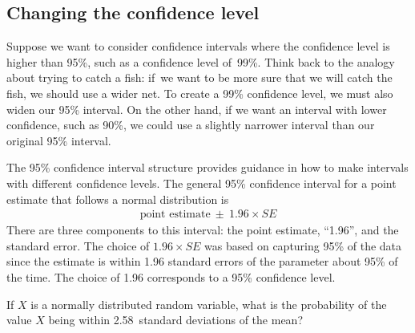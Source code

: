 \D{\newpage}

\subsection{Changing the confidence level}
\label{changingTheConfidenceLevelSection}


Suppose we want to consider confidence intervals where the confidence
level is higher than 95\%, such as a confidence
level of~99\%. Think back to the analogy about trying to catch a fish:
if~we want to be more sure that we will catch the fish, we should use
a wider net. To create a 99\% confidence level, we must also widen our
95\% interval. On the other hand, if we want an interval with lower
confidence, such as 90\%, we could use a slightly narrower
interval than our original 95\% interval.

The 95\% confidence interval structure provides guidance in
how to make intervals with different confidence levels.
The general 95\% confidence interval for a point estimate
that follows a normal distribution is
\begin{eqnarray*}
\text{point estimate}\ \pm\ 1.96 \times SE
\end{eqnarray*}
There are three components to this interval: the point estimate,
``1.96'', and the standard error. The choice of $1.96\times SE$ was
based on capturing 95\% of the data since the estimate is within
1.96 standard errors of the parameter about 95\% of the time.
The choice of 1.96 corresponds to a 95\% confidence level. 

\begin{exercisewrap}
\begin{nexercise} \label{leadInForMakingA99PercentCIExercise}
If $X$ is a normally distributed random variable, what is the
probability of the value $X$ being
within 2.58~standard deviations of the mean?\footnotemark
\end{nexercise}
\end{exercisewrap}

